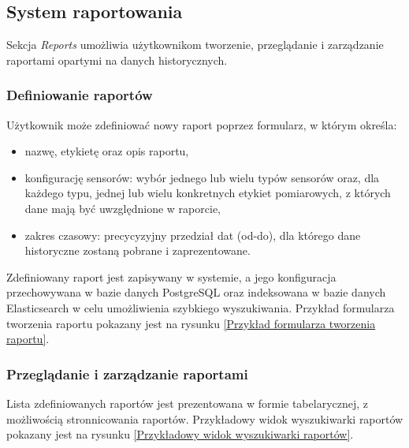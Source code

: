 
\newpage

\subsection{System raportowania}
Sekcja \textit{Reports} umożliwia użytkownikom tworzenie, przeglądanie i zarządzanie raportami opartymi na danych historycznych.

\subsubsection{Definiowanie raportów}
Użytkownik może zdefiniować nowy raport poprzez formularz, w którym określa:
\begin{itemize}
    \item nazwę, etykietę oraz opis raportu,
    \item konfigurację sensorów: wybór jednego lub wielu typów sensorów oraz, dla każdego typu, jednej lub wielu konkretnych etykiet pomiarowych, z których dane mają być uwzględnione w raporcie,
    \item zakres czasowy: precycyzyjny przedział dat (od-do), dla którego dane historyczne zostaną pobrane i zaprezentowane.
\end{itemize}
\vspace{0.3em}
Zdefiniowany raport jest zapisywany w systemie, a jego konfiguracja przechowywana w bazie danych PostgreSQL oraz indeksowana w bazie danych Elasticsearch w celu umożliwienia szybkiego wyszukiwania. Przykład formularza tworzenia raportu pokazany jest na rysunku \ref{Przykład formularza tworzenia raportu}.


\newpage

\subsubsection{Przeglądanie i zarządzanie raportami}

Lista zdefiniowanych raportów jest prezentowana w formie tabelarycznej, z możliwością stronnicowania raportów. Przykładowy widok wyszukiwarki raportów pokazany jest na rysunku \ref{Przykładowy widok wyszukiwarki raportów}.

\vspace{0.3em}

